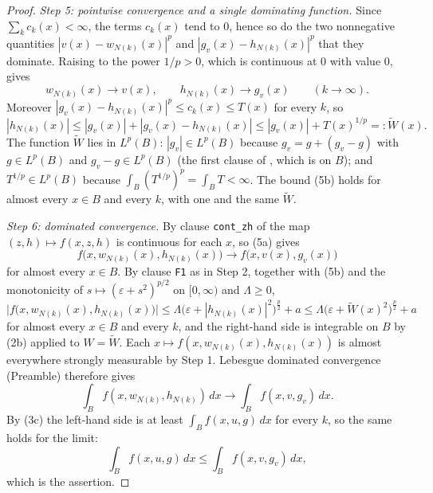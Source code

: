 \begin{proof}
\emph{Step 5: pointwise convergence and a single dominating function.}  Since
$\sum_kc_k(x)<\infty$, the terms $c_k(x)$ tend to $0$, hence so do the two
nonnegative quantities $|v(x)-w_{N(k)}(x)|^p$ and $|g_v(x)-h_{N(k)}(x)|^p$ that
they dominate.  Raising to the power $1/p>0$, which is continuous at $0$ with
value $0$, gives
\[
w_{N(k)}(x)\to v(x),\qquad h_{N(k)}(x)\to g_v(x)\qquad(k\to\infty).
\tag{5a}
\]
Moreover $|g_v(x)-h_{N(k)}(x)|^p\le c_k(x)\le T(x)$ for every $k$, so
\[
|h_{N(k)}(x)|\le|g_v(x)|+|g_v(x)-h_{N(k)}(x)|\le|g_v(x)|+T(x)^{1/p}
=:\widetilde W(x) .
\tag{5b}
\]
The function $\widetilde W$ lies in $L^p(B)$: $|g_v|\in L^p(B)$ because
$g_v=g+(g_v-g)$ with $g\in L^p(B)$ and $g_v-g\in L^p(B)$ (the first clause of
, which is  on $B$); and
$T^{1/p}\in L^p(B)$ because $\int_B(T^{1/p})^p=\int_BT<\infty$.  The bound
(5b) holds for almost every $x\in B$ and every $k$, with one and the same
$\widetilde W$.

\emph{Step 6: dominated convergence.}  By clause \texttt{cont\_zh} of
 the map $(z,h)\mapsto f(x,z,h)$ is
continuous for each $x$, so (5a) gives
\[
f\bigl(x,w_{N(k)}(x),h_{N(k)}(x)\bigr)\longrightarrow f\bigl(x,v(x),g_v(x)\bigr)
\]
for almost every $x\in B$.  By clause \texttt{F1} as in Step 2, together with
(5b) and the monotonicity of $s\mapsto(\varepsilon+s^2)^{p/2}$ on $[0,\infty)$
and $\Lambda\ge0$,
\[
\bigl|f\bigl(x,w_{N(k)}(x),h_{N(k)}(x)\bigr)\bigr|
\le\Lambda\bigl(\varepsilon+|h_{N(k)}(x)|^2\bigr)^{\frac p2}+a
\le\Lambda\bigl(\varepsilon+\widetilde W(x)^2\bigr)^{\frac p2}+a
\]
for almost every $x\in B$ and every $k$, and the right-hand side is integrable
on $B$ by (2b) applied to $W=\widetilde W$.  Each
$x\mapsto f(x,w_{N(k)}(x),h_{N(k)}(x))$ is almost everywhere strongly
measurable by Step 1.  Lebesgue dominated convergence (Preamble) therefore
gives
\[
\int_Bf(x,w_{N(k)},h_{N(k)})\,dx\longrightarrow\int_Bf(x,v,g_v)\,dx .
\]
By (3c) the left-hand side is at least $\int_Bf(x,u,g)\,dx$ for every $k$, so
the same holds for the limit:
\[
\int_Bf(x,u,g)\,dx\le\int_Bf(x,v,g_v)\,dx ,
\]
which is the assertion.
\end{proof}
